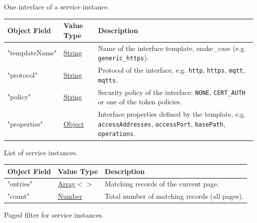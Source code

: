 \documentclass[a4paper]{arrowhead}
\newcommand{\mref}[2][]{{\textcolor{ArrowheadPurple}{\hyperref[sec:model:#2]{\ifstrempty{#1}{#2}{#1}}}}}
\newcommand{\pref}[1]{{\textcolor{ArrowheadGrey}{\hyperref[sec:model:primitives:#1]{#1}}}}
\begin{document}

One interface of a service instance.


\noindent\begin{tabularx}{\textwidth}{| >{\raggedright\arraybackslash}p{3.9cm} | >{\raggedright\arraybackslash\small}p{5.3cm} | X |} \hline
\rowcolor{gray!33} Object Field & Value Type & Description \\ \hline
"template\allowbreak{}Name" & \pref{String} & Name of the interface template, snake\_case (e.g. \texttt{generic\_\allowbreak{}https}). \\ \hline
"protocol" & \pref{String} & Protocol of the interface, e.g. \texttt{http}, \texttt{https}, \texttt{mqtt}, \texttt{mqtts}. \\ \hline
"policy" & \pref{String} & Security policy of the interface: \texttt{NONE}, \texttt{CERT\_\allowbreak{}AUTH} or one of the token policies. \\ \hline
"properties" & \pref{Object} & Interface properties defined by the template, e.g. \texttt{accessAddresses}, \texttt{accessPort}, \texttt{basePath}, \texttt{operations}. \\ \hline
\end{tabularx}




List of service instances.


\noindent\begin{tabularx}{\textwidth}{| >{\raggedright\arraybackslash}p{3.9cm} | >{\raggedright\arraybackslash\small}p{5.3cm} | X |} \hline
\rowcolor{gray!33} Object Field & Value Type & Description \\ \hline
"entries" & \pref{Array}$<$\allowbreak{}\mref{ServiceInstanceResponse}$>$ & Matching records of the current page. \\ \hline
"count" & \pref{Number} & Total number of matching records (all pages). \\ \hline
\end{tabularx}




Paged filter for service instances.
\end{document}
